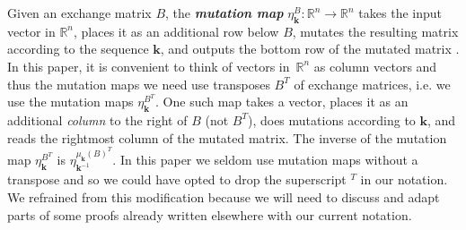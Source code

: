 \documentclass[10pt]{article}
\theoremstyle{definition}
\theoremstyle{remark}
\numberwithin{equation}{section}
\newcommand{\newword}[1]{\textbf{\emph{#1}}}
\newcommand{\reals}{\mathbb R}
\newcommand{\0}{{\mathbf{0}}}
\newcommand{\kk}{{\boldsymbol{k}}}
\begin{document}
Given an exchange matrix $B$, the \newword{mutation map} $\eta^B_\kk:\reals^n\to\reals^n$ takes the input vector in $\reals^n$, places it as an additional row below $B$, mutates the resulting matrix according to the sequence $\kk$, and outputs the bottom row of the mutated matrix \cite[Definition~4.1]{universal}.
In this paper, it is convenient to think of vectors in~$\reals^n$ as column vectors and thus the mutation maps we need use transposes $B^T$ of exchange matrices, i.e. we use the mutation maps $\eta_\kk^{B^T}$.
One such map takes a vector, places it as an additional \emph{column} to the right of $B$ (not $B^T$), does mutations according to $\kk$, and reads the rightmost column of the mutated matrix.
The inverse of the mutation map $\eta^{B^T}_\kk$ is $\eta_{\kk^{-1}}^{\mu_\kk(B)^T}$.
In this paper we seldom use mutation maps without a transpose and so we could have opted to drop the superscript $^T$ in our notation.
We refrained from this modification because we will need to discuss and adapt parts of some proofs already written elsewhere with our current notation.
\end{document}

